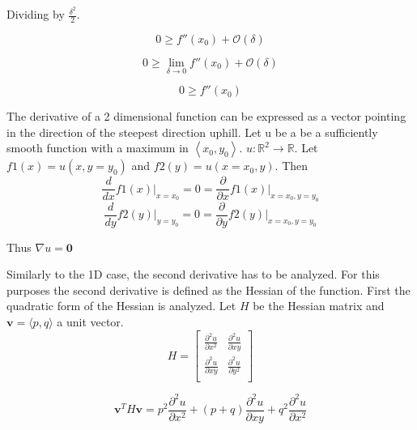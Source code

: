 \documentclass{article}
\begin{document}
Dividing by $\frac{\delta^2}{2}$.

\begin{equation}
    0 \geq f''(x_{0}) + \mathcal{O}(\delta)
\end{equation}

\begin{equation}
    0 \geq \lim_{\delta \to 0} f''(x_{0}) + \mathcal{O}(\delta)
\end{equation}

\begin{equation}
    0 \geq f''(x_{0})
    \label{eq:proooof}
\end{equation}

The derivative of a 2 dimensional function can be expressed as a vector pointing in the direction of the steepest direction uphill.
Let u be a be a sufficiently smooth function with a maximum in $ \left<x_{0}, y_{0}\right> $. $ u: \mathbb{R}^{2} \to \mathbb{R} $.
Let $f1(x) = u(x,y=y_{0})$ and $f2(y) = u(x=x_{0},y)$. Then
\begin{equation}
    \frac{d}{dx}f1(x)\bigg|_{x=x_{0}} = 0 = \frac{\partial}{\partial x}f1(x)\bigg|_{x=x_{0},y=y_{0}}
\end{equation}{}
\begin{equation}
    \frac{d}{dy}f2(y)\bigg|_{y=y_{0}} = 0 = \frac{\partial}{\partial y}f2(y)\bigg|_{x=x_{0},y=y_{0}}
\end{equation}{}

Thus $\nabla u = \mathbf{0}$

Similarly to the 1D case, the second derivative has to be analyzed. For this purposes the second derivative is defined as the Hessian of the function.
First the quadratic form of the Hessian is analyzed. Let $H$ be the Hessian matrix and $\mathbf{v}=\langle p, q\rangle$ a unit vector.
\begin{equation}
 H = \begin{bmatrix}
      \frac{\partial^2 u}{\partial x^2} & \frac{\partial^2 u}{\partial xy}\\
      \frac{\partial^2 u}{\partial xy} & \frac{\partial^2 u}{\partial y^2}\\
    \end{bmatrix}
\end{equation}

\begin{equation}
\mathbf{v}^{T} H \mathbf{v}= p^2\frac{\partial^2 u}{\partial x^2}+(p+q)\frac{\partial^2 u}{\partial xy} +q^2\frac{\partial^2 u}{\partial x^2}
\end{equation}
\end{document}
